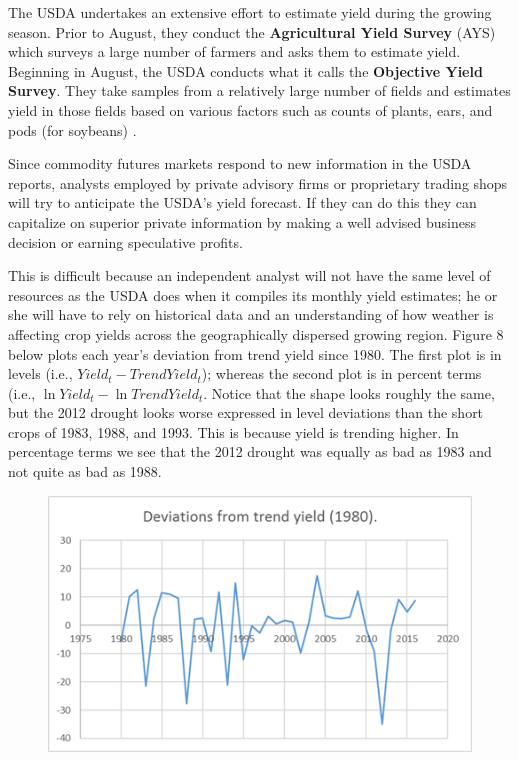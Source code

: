 \documentclass[]{book}
\theoremstyle{definition}
\theoremstyle{definition}
\theoremstyle{remark}
\begin{document}
The USDA undertakes an extensive effort to estimate yield during the
growing season. Prior to August, they conduct the \textbf{Agricultural
Yield Survey} (AYS) which surveys a large number of farmers and asks
them to estimate yield. Beginning in August, the USDA conducts what it
calls the \textbf{Objective Yield Survey}. They take samples from a
relatively large number of fields and estimates yield in those fields
based on various factors such as counts of plants, ears, and pods (for
soybeans) \citep{good2011yield}.

Since commodity futures markets respond to new information in the USDA
reports, analysts employed by private advisory firms or proprietary
trading shops will try to anticipate the USDA's yield forecast. If they
can do this they can capitalize on superior private information by
making a well advised business decision or earning speculative profits.

This is difficult because an independent analyst will not have the same
level of resources as the USDA does when it compiles its monthly yield
estimates; he or she will have to rely on historical data and an
understanding of how weather is affecting crop yields across the
geographically dispersed growing region. Figure 8 below plots each
year's deviation from trend yield since 1980. The first plot is in
levels (i.e., \(Yield_t - Trend Yield_t\)); whereas the second plot is
in percent terms (i.e., \(\ln{Yield_t} - \ln{Trend Yield_t}\). Notice
that the shape looks roughly the same, but the 2012 drought looks worse
expressed in level deviations than the short crops of 1983, 1988, and
1993. This is because yield is trending higher. In percentage terms we
see that the 2012 drought was equally as bad as 1983 and not quite as
bad as 1988.

\begin{figure}[htbp]
\centering
\includegraphics{Excel-files/ForecastingProduction-HistoricalAcreage_files/image016.png}
\caption{}
\end{figure}
\end{document}
